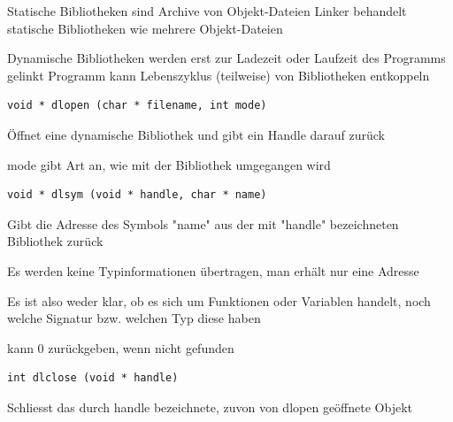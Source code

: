 \begin{multicols*}{5}
Statische Bibliotheken sind Archive von Objekt-Dateien
Linker behandelt statische Bibliotheken wie mehrere Objekt-Dateien




Dynamische Bibliotheken werden erst zur Ladezeit oder Laufzeit des Programms gelinkt
Programm kann Lebenszyklus (teilweise) von Bibliotheken entkoppeln
\vspace{-6pt}
\begin{lstlisting}
void * dlopen (char * filename, int mode)
\end{lstlisting}
\vspace{-6pt}
	\begin{compactitem}[$\bullet$]
		\item Öffnet eine dynamische Bibliothek und gibt ein Handle darauf zurück
		\item mode gibt Art an, wie mit der Bibliothek umgegangen wird
	\end{compactitem}


	\vspace{-6pt}
	\begin{lstlisting}
void * dlsym (void * handle, char * name)
	\end{lstlisting}
	\vspace{-6pt}
		\begin{compactitem}[$\bullet$]
			\item Gibt die Adresse des Symbols "name" aus der mit "handle" bezeichneten Bibliothek zurück
			\item Es werden keine Typinformationen übertragen, man erhält nur eine Adresse 
			\item Es ist also weder klar, ob es sich um Funktionen oder Variablen handelt, noch welche Signatur bzw. welchen Typ diese haben
			\item kann 0 zurückgeben, wenn nicht gefunden
		\end{compactitem}



		\vspace{-6pt}
	\begin{lstlisting}
int dlclose (void * handle)
	\end{lstlisting}
	\vspace{-6pt}
	\begin{compactitem}[$\bullet$]
		\item Schliesst das durch handle bezeichnete, zuvon von dlopen geöffnete Objekt
	\end{compactitem}
		




\end{multicols*}
